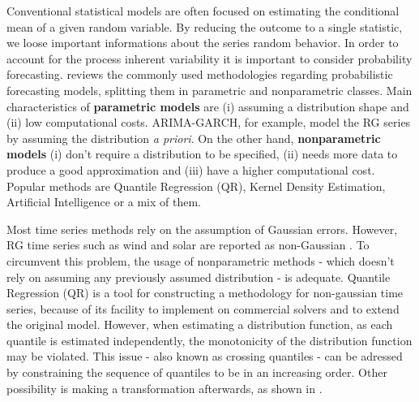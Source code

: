 
Conventional statistical models are often focused on estimating the conditional mean of a given random variable. %
By reducing the outcome to a single statistic, we loose important informations about the series random behavior. In order to account for the process inherent variability it is important to consider probability forecasting.
\cite{zhang_review_2014} reviews the commonly used methodologies regarding probabilistic forecasting models, splitting them in parametric and nonparametric classes. Main characteristics of \textbf{parametric models} are (i) assuming a distribution shape and (ii) low computational costs. ARIMA-GARCH, for example, model the RG series by assuming the distribution \textit{a priori}. On the other hand, \textbf{nonparametric models} (i) don't require a distribution to be specified, (ii) needs more data to produce a good approximation and (iii) have a higher computational cost. Popular methods are Quantile Regression (QR), Kernel Density Estimation,  Artificial Intelligence or a mix of them.


Most time series methods rely on the assumption of Gaussian errors. However, RG time series such as wind and solar are reported as non-Gaussian \cite{bessa2012time,jeon2012using,taylor2015forecasting,Wan2017}. To circumvent this problem, the usage of nonparametric methods - which doesn't rely on assuming any previously assumed distribution - is adequate. 
Quantile Regression (QR) is a tool for constructing a methodology for non-gaussian time series, because of its facility to implement on commercial solvers and to extend the original model.
However, when estimating a distribution function, as each quantile is estimated independently, the monotonicity of the distribution function may be violated.
This issue - also known as crossing quantiles - can be adressed by constraining the sequence of quantiles to be in an increasing order. Other possibility is making a transformation afterwards, as shown in \cite{chernozhukov_quantile_2010}.

